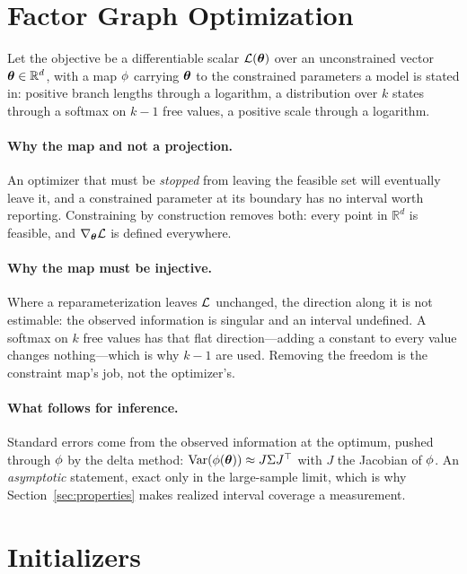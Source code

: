 \documentclass[11pt,a4paper]{article}
\begin{document}
\section{Factor Graph Optimization}
\label{sec:abstraction}

Let the objective be a differentiable scalar $\mathcal{L}(\boldsymbol{\theta})$ over an
unconstrained vector $\boldsymbol{\theta} \in \mathbb{R}^d$, with a map $\phi$
carrying $\boldsymbol{\theta}$ to the constrained parameters a model is stated in:
positive branch lengths through a logarithm, a distribution over $k$ states
through a softmax on $k-1$ free values, a positive scale through a logarithm.

\paragraph{Why the map and not a projection.}
An optimizer that must be \emph{stopped} from leaving the feasible set will
eventually leave it, and a constrained parameter at its boundary has no
interval worth reporting. Constraining by construction removes both: every
point in $\mathbb{R}^d$ is feasible, and $\nabla_{\boldsymbol{\theta}} \mathcal{L}$ is
defined everywhere.

\paragraph{Why the map must be injective.}
Where a reparameterization leaves $\mathcal{L}$ unchanged, the direction along
it is not estimable: the observed information is singular and an interval
undefined. A softmax on $k$ free values has that flat direction---adding a
constant to every value changes nothing---which is why $k-1$ are used.
Removing the freedom is the constraint map's job, not the optimizer's.

\paragraph{What follows for inference.}
Standard errors come from the observed information at the optimum, pushed
through $\phi$ by the delta method: $\mathrm{Var}(\phi(\boldsymbol{\theta}))
\approx J \Sigma J^{\top}$ with $J$ the Jacobian of $\phi$. An
\emph{asymptotic} statement, exact only in the large-sample limit, which is why
Section~\ref{sec:properties} makes realized interval coverage a measurement.

\section{Initializers}
\label{sec:initializers}
\end{document}
